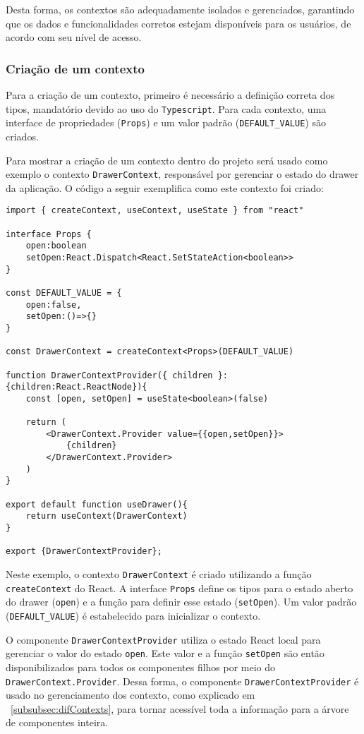 Desta forma, os contextos são adequadamente isolados e gerenciados, garantindo que os dados e funcionalidades corretos estejam disponíveis para os usuários, de acordo com seu nível de acesso.


\subsubsection{Criação de um contexto}\label{subsubsec:contextCreation}
Para a criação de um contexto, primeiro é necessário a definição correta dos tipos, mandatório devido ao uso do \texttt{Typescript}. Para cada contexto, uma interface de propriedades (\texttt{Props}) e um valor padrão (\texttt{DEFAULT\_VALUE}) são criados. 

Para mostrar a criação de um contexto dentro do projeto será usado como exemplo  o contexto \texttt{DrawerContext}, responsável por gerenciar o estado do drawer da aplicação. O código a seguir exemplifica como este contexto foi criado:

\begin{verbatim}
import { createContext, useContext, useState } from "react"

interface Props {
    open:boolean
    setOpen:React.Dispatch<React.SetStateAction<boolean>>
}

const DEFAULT_VALUE = {
    open:false,
    setOpen:()=>{}
}

const DrawerContext = createContext<Props>(DEFAULT_VALUE)

function DrawerContextProvider({ children }:{children:React.ReactNode}){
    const [open, setOpen] = useState<boolean>(false)

    return (
        <DrawerContext.Provider value={{open,setOpen}}>
            {children}
        </DrawerContext.Provider>
    )
}

export default function useDrawer(){
    return useContext(DrawerContext)
}

export {DrawerContextProvider};
\end{verbatim}

Neste exemplo, o contexto \texttt{DrawerContext} é criado utilizando a função \texttt{createContext} do React. A interface \texttt{Props} define os tipos para o estado aberto do drawer (\texttt{open}) e a função para definir esse estado (\texttt{setOpen}). Um valor padrão (\texttt{DEFAULT\_VALUE}) é estabelecido para inicializar o contexto. 

O componente \texttt{DrawerContextProvider} utiliza o estado React local para gerenciar o valor do estado \texttt{open}. Este valor e a função \texttt{setOpen} são então disponibilizados para todos os componentes filhos por meio do \texttt{DrawerContext.Provider}. Dessa forma, o componente \texttt{DrawerContextProvider} é usado no gerenciamento dos contexto, como explicado em ~\ref{subsubsec:difContexts}, para tornar acessível toda a informação para a árvore de componentes inteira.

